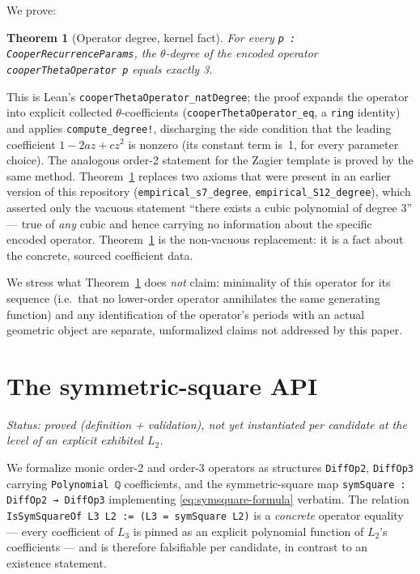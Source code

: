 \documentclass[11pt]{article}
\newtheorem{theorem}{Theorem}[section]
\begin{document}
We prove:
\begin{theorem}[Operator degree, kernel fact]
\label{thm:degree}
For every \lstinline{p : CooperRecurrenceParams}, the $\theta$-degree of the
encoded operator \lstinline{cooperThetaOperator p} equals exactly 3.
\end{theorem}
This is Lean's \lstinline{cooperThetaOperator_natDegree}; the proof expands
the operator into explicit collected $\theta$-coefficients
(\lstinline{cooperThetaOperator_eq}, a \texttt{ring} identity) and applies
\lstinline{compute_degree!}, discharging the side condition that the leading
coefficient $1-2az+cz^2$ is nonzero (its constant term is~1, for every
parameter choice). The analogous order-2 statement for the Zagier template is
proved by the same method. Theorem~\ref{thm:degree} replaces two axioms that
were present in an earlier version of this repository
(\lstinline{empirical_s7_degree}, \lstinline{empirical_S12_degree}), which
asserted only the vacuous statement ``there exists a cubic polynomial of
degree 3'' --- true of \emph{any} cubic and hence carrying no information
about the specific encoded operator. Theorem~\ref{thm:degree} is the
non-vacuous replacement: it is a fact about the concrete, sourced coefficient
data.

We stress what Theorem~\ref{thm:degree} does \emph{not} claim: minimality of
this operator for its sequence (i.e.\ that no lower-order operator annihilates
the same generating function) and any identification of the operator's
periods with an actual geometric object are separate, unformalized claims not
addressed by this paper.

\section{The symmetric-square API}
\label{sec:symsquare}

\emph{Status: proved (definition + validation), not yet instantiated per
candidate at the level of an explicit exhibited $L_2$.}

We formalize monic order-2 and order-3 operators as structures
\lstinline{DiffOp2}, \lstinline{DiffOp3} carrying \lstinline{Polynomial ℚ}
coefficients, and the symmetric-square map
\lstinline{symSquare : DiffOp2 → DiffOp3} implementing
\eqref{eq:symsquare-formula} verbatim. The relation
\lstinline{IsSymSquareOf L3 L2 := (L3 = symSquare L2)} is a \emph{concrete}
operator equality --- every coefficient of $L_3$ is pinned as an explicit
polynomial function of $L_2$'s coefficients --- and is therefore falsifiable
per candidate, in contrast to an existence statement.
\end{document}

